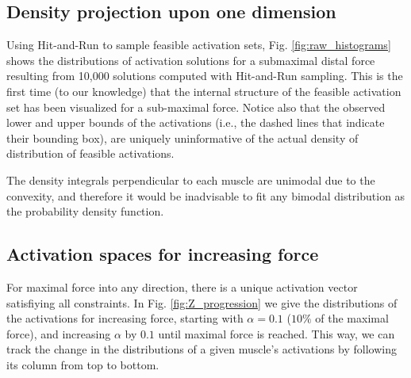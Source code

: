 
\subsection*{Density projection upon one dimension} %
\label{ssub:density_projection_upon_one_dimension}


Using Hit-and-Run to sample feasible activation sets, Fig. \ref{fig:raw_histograms} shows the distributions of activation solutions for a submaximal distal force resulting from 10,000 solutions computed with Hit-and-Run sampling.
This is the first time (to our knowledge) that the internal structure of the feasible activation set has been visualized for a sub-maximal force.
Notice also that the observed lower and upper bounds of the activations (i.e., the dashed lines that indicate their bounding box), are uniquely uninformative of the actual density of distribution of feasible activations.

The density integrals perpendicular to each muscle are unimodal due to the convexity\cite{ball1997elementary}, and therefore it would be inadvisable to fit any bimodal distribution as the probability density function.

\subsection*{Activation spaces for increasing force} %
\label{sub:activation_spaces_for_increasing_force}
For maximal force into any direction, there is a unique activation vector satisfiying all constraints.
In Fig. \ref{fig:Z_progression} we give the distributions of the activations for increasing force, starting with $\alpha=0.1$ ($10\%$ of the maximal force), and increasing $\alpha$ by $0.1$ until maximal force is reached.
This way, we can track the change in the distributions of a given muscle's activations by following its column from top to bottom.

